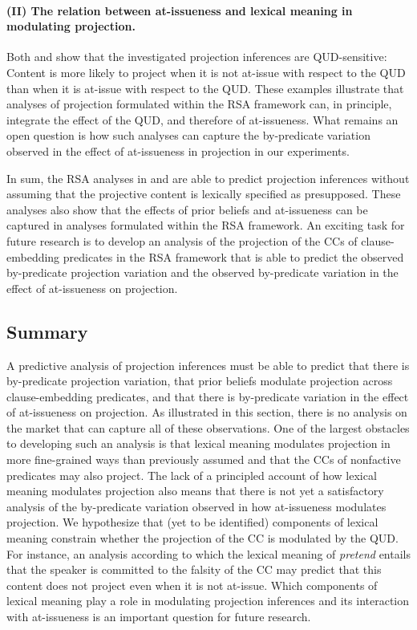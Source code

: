 \documentclass[11pt,fleqn]{article}
\newcommand{\6}{\mbox{$[\hspace*{-.6mm}[$}}
\newcommand{\9}{\mbox{$]\hspace*{-.6mm}]$}}
\begin{document}
\paragraph{(II) The relation between at-issueness and lexical meaning in modulating projection.} Both \citealt{qing-etal2016} and \citealt{warstadt2022} show that the investigated projection inferences are QUD-sensitive: Content is more likely to project when it is not at-issue with respect to the QUD than when it is at-issue with respect to the QUD. These examples illustrate that analyses of projection formulated within the RSA framework can, in principle, integrate the effect of the QUD, and therefore of at-issueness. What remains an open question is how such analyses can capture the by-predicate variation observed in the effect of at-issueness in projection in our experiments. 

\bigskip

In sum, the RSA analyses in \citealt{qing-etal2016} and \citealt{warstadt2022} are able to predict projection inferences without assuming that the projective content is lexically specified as presupposed. These analyses also show that the effects of prior beliefs and at-issueness can be captured in analyses formulated within the RSA framework. An exciting task for future research is to develop an analysis of the projection of the CCs of clause-embedding predicates in the RSA framework that is able to predict the observed by-predicate projection variation and the observed by-predicate variation in the effect of at-issueness on projection.


\subsection{Summary}

A predictive analysis of projection inferences must be able to predict that there is by-predicate projection variation, that prior beliefs modulate projection across clause-embedding predicates, and that there is by-predicate variation in the effect of at-issueness on projection. As illustrated in this section, there is no analysis on the market that can capture all of these observations. One of the largest obstacles to developing such an analysis is that lexical meaning modulates projection in more fine-grained ways than previously assumed and that the CCs of nonfactive predicates may also project. The lack of a principled account of how lexical meaning modulates projection also means that there is not yet a satisfactory analysis of the by-predicate variation observed in how at-issueness modulates projection. We hypothesize that (yet to be identified) components of lexical meaning constrain whether the projection of the CC  is modulated by the QUD. For instance, an analysis according to which the lexical meaning of {\em pretend} entails that the speaker is committed to the falsity of the CC may predict that this content does not project even when it is not at-issue. Which components of lexical meaning play a role in modulating projection inferences and its interaction with at-issueness is an important question for future research.
\end{document}
